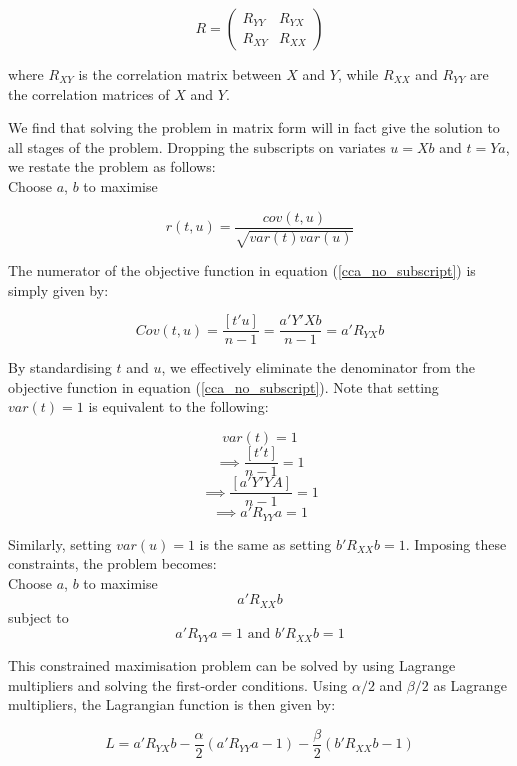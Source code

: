 
$$R = 
\begin{pmatrix}
R_{YY} & R_{YX} \\
R_{XY} & R_{XX} 
\end{pmatrix}
$$

where $R_{XY}$ is the correlation matrix between $X$ and $Y$, while $R_{XX}$ and $R_{YY}$ are the correlation matrices of $X$ and $Y$.  


We find that solving the problem in matrix form will in fact give the solution to all 
stages of the problem. Dropping the subscripts on variates $u = Xb$ and $t = Ya$, we restate the problem as follows:\\

Choose $a$, $b$ to maximise 

\begin{equation}
\label{cca_no_subscript}
r(t, u)=\frac{cov(t,u)}{\sqrt{var(t)var(u)}}
\end{equation}

The numerator of the objective function in equation (\ref{cca_no_subscript}) is simply given by:

$$Cov(t,u) = \frac{[t'u]}{n-1}=\frac{a'Y'Xb}{n-1} = a'R_{YX}b$$

By standardising $t$ and $u$, we effectively eliminate the denominator from the objective 
function in equation (\ref{cca_no_subscript}). Note that setting $ var(t) = 1 $ is equivalent to the following:
  
$$ var(t) = 1 $$
$$\implies \frac{[t't]}{n-1} = 1 $$
$$ \implies \frac{[a'Y'YA]}{n-1} = 1 $$
$$ \implies a'R_{YY}a = 1$$

Similarly, setting $var(u) = 1$ is the same as setting $b'R_{XX}b = 1$. Imposing these 
constraints, the problem becomes:\\

Choose $a$, $b$ to maximise 
$$a'R_{XX}b$$ 
subject to 
\begin{equation}
\label{cca_constraints}
a'R_{YY}a = 1 \text{ and } b'R_{XX}b = 1
\end{equation}

This constrained maximisation problem can be solved by using Lagrange multipliers and solving the first-order conditions. Using $\alpha/2$ and $\beta/2$ as Lagrange multipliers, the Lagrangian function is then given by:

\begin{equation}
 L = a'R_{YX}b - \frac{\alpha}{2}(a'R_{YY}a - 1) - \frac{\beta}{2}(b'R_{XX}b - 1) 
\end{equation}

